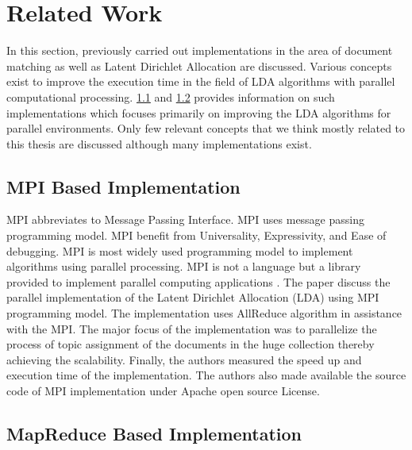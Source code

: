 \section{Related Work}
\label{section: Related work}
In this section, previously carried out implementations in the area of document matching as well as Latent Dirichlet Allocation are discussed. Various concepts exist to improve the execution time in the field of LDA algorithms with parallel computational processing.  \ref{subsection: mpi based} and \ref{subsection: Mapreduce based} provides information on such implementations which focuses primarily on improving the LDA algorithms for parallel environments. Only few relevant concepts that we think mostly related to this thesis are discussed although many implementations exist.


\subsection{MPI Based Implementation}
\label{subsection: mpi based}
MPI abbreviates to Message Passing Interface. MPI uses message passing programming model. MPI benefit from Universality, Expressivity, and Ease of debugging. MPI is most widely used programming model to implement algorithms using parallel processing. MPI is not a language but a library provided to implement parallel computing applications \cite{gropp1999using}. The paper \cite{wang2009plda} discuss the parallel implementation of the Latent Dirichlet Allocation (LDA) using MPI programming model. The implementation uses AllReduce algorithm in assistance with the MPI. The major focus of the implementation was to parallelize the process of topic assignment of the documents in the huge collection thereby achieving the scalability. Finally, the authors measured the speed up and execution time of the implementation. The authors also made available the source code of MPI implementation under Apache open source License.

\subsection{MapReduce Based Implementation}
\label{subsection: Mapreduce based}

